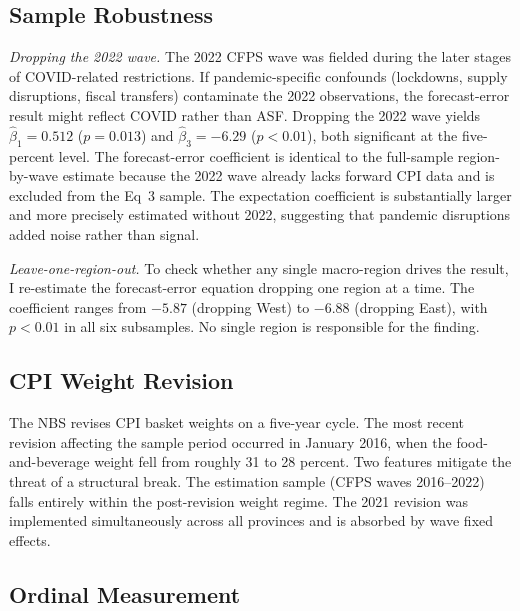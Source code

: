\subsection{Sample Robustness}\label{sec:sample_robust}

\textit{Dropping the 2022 wave.}
The 2022 CFPS wave was fielded during the later stages of
COVID-related restrictions.
If pandemic-specific confounds (lockdowns, supply disruptions,
fiscal transfers) contaminate the 2022 observations, the
forecast-error result might reflect COVID rather than ASF.
Dropping the 2022 wave yields $\hat{\beta}_1 = 0.512$
($p = 0.013$) and $\hat{\beta}_3 = -6.29$ ($p < 0.01$),
both significant at the five-percent level.
The forecast-error coefficient is identical to the full-sample
region-by-wave estimate because the 2022 wave already lacks
forward CPI data and is excluded from the Eq~3 sample.
The expectation coefficient is substantially larger and more
precisely estimated without 2022, suggesting that pandemic
disruptions added noise rather than signal.

\textit{Leave-one-region-out.}
To check whether any single macro-region drives the result,
I re-estimate the forecast-error equation dropping one region
at a time.
The coefficient ranges from $-5.87$ (dropping West) to
$-6.88$ (dropping East), with $p < 0.01$ in all six
subsamples.
No single region is responsible for the finding.

\subsection{CPI Weight Revision}\label{sec:cpi_weights}

The NBS revises CPI basket weights on a five-year cycle.
The most recent revision affecting the sample period occurred
in January 2016, when the food-and-beverage weight fell from
roughly 31 to 28 percent.
Two features mitigate the threat of a structural break.
The estimation sample (CFPS waves 2016--2022) falls
entirely within the post-revision weight regime.
The 2021 revision was implemented simultaneously
across all provinces and is absorbed by wave fixed effects.

\subsection{Ordinal Measurement}\label{sec:ordinal_robust}

